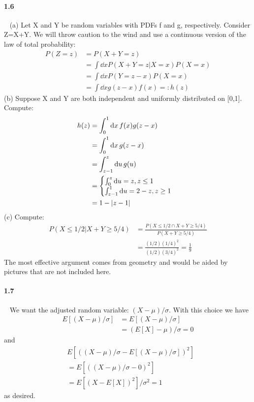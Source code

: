 \documentclass{article}
\begin{document}
\paragraph{1.6}\ \newline
(a) Let X and Y be random variables with PDFs f and g, respectively. Consider Z=X+Y. We will throw caution to the wind and use a continuous version of the law of total probability:
\begin{align}
    P(Z=z)
    &=P(X+Y=z) \\
    &=\int \dd{x} P(X+Y=z | X=x) P(X=x) \\
    &=\int \dd{x} P(Y=z-x) P(X=x) \\
    &=\int \dd{x} g(z-x) f(x) =: h(z)
\end{align}
\newline
\newline
(b) Suppose X and Y are both independent and uniformly distributed on [0,1]. Compute:
\begin{align}
    h(z)
    &=\int_0^1 \dd{x} f(x) g(z-x) \\
    &=\int_0^1 \dd{x} g(z-x) \\
    &=\int_{z-1}^{z} \dd{u} g(u) \\
    &=
    \begin{cases}
        \int_{0}^{z}\dd{u} = z, z \le 1 \\
        \int_{z-1}^{1}\dd{u} = 2-z, z \ge 1
    \end{cases} \\
    &= 1-\abs{z-1}
\end{align}
\newline
\newline
(c) Compute:
\begin{align}
    P(X \le 1/2 | X+Y \ge 5/4) 
    &= \frac{P(X \le 1/2 \cap X+Y \ge 5/4)}{P(X+Y \ge 5/4)} \\
    &= \frac{(1/2)(1/4)^2}{(1/2)(3/4)^2} = \frac{1}{9}
\end{align}
The most effective argument comes from geometry and would be aided by pictures that are not included here.

\paragraph{1.7}\ \newline
We want the adjusted random variable: $(X-\mu)/\sigma$. With this choice we have
\begin{align}
    E[(X-\mu)/\sigma]
    &=E[(X-\mu)/\sigma] \\
    &=(E[X]-\mu)/\sigma = 0
\end{align}
and
\begin{align}
    &E[((X-\mu)/\sigma-E[(X-\mu)/\sigma])^2] \\
    &=E[((X-\mu)/\sigma - 0)^2]\\
    &=E[(X-E[X])^2]/\sigma^2 = 1
\end{align}
as desired.
\end{document}
